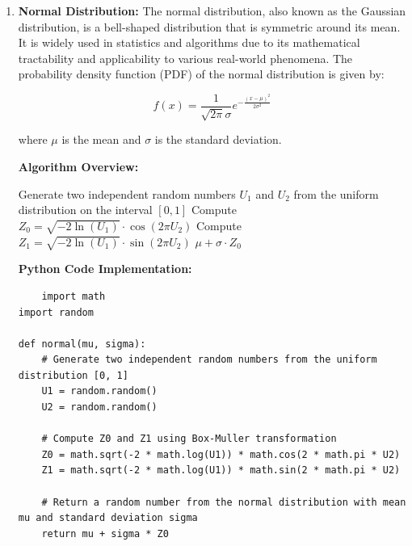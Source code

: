 \documentclass[12pt]{book} %
\begin{document}
\begin{enumerate}
\begin{lstlisting}
def binomial(n, p):
    X = 0
    for i in range(n):
        X += np.random.binomial(1, p)
    return X

# Example usage:
n = 10  # Number of trials
p = 0.5  # Probability of success
result = binomial(n, p)
print("Result:", result)
\end{lstlisting}
    
    \item \textbf{Normal Distribution:} The normal distribution, also known as the Gaussian distribution, is a bell-shaped distribution that is symmetric around its mean. It is widely used in statistics and algorithms due to its mathematical tractability and applicability to various real-world phenomena. The probability density function (PDF) of the normal distribution is given by:
    
    \[
    f(x) = \frac{1}{\sqrt{2\pi}\sigma} e^{-\frac{(x-\mu)^2}{2\sigma^2}}
    \]
    
    where \(\mu\) is the mean and \(\sigma\) is the standard deviation.

\textbf{Algorithm Overview:}
    \FloatBarrier
\begin{algorithm}
\caption{Generating Random Numbers from a Normal Distribution (Box-Muller Method)}
\begin{algorithmic}[1]
    \State Generate two independent random numbers \(U_1\) and \(U_2\) from the uniform distribution on the interval \([0, 1]\)
    \State Compute \(Z_0 = \sqrt{-2 \ln(U_1)} \cdot \cos(2\pi U_2)\)
    \State Compute \(Z_1 = \sqrt{-2 \ln(U_1)} \cdot \sin(2\pi U_2)\)
    \State \Return \(\mu + \sigma \cdot Z_0\)
\EndProcedure
\end{algorithmic}
\end{algorithm}
\FloatBarrier
\textbf{Python Code Implementation:}
\FloatBarrier
\begin{lstlisting}
    import math
import random

def normal(mu, sigma):
    # Generate two independent random numbers from the uniform distribution [0, 1]
    U1 = random.random()
    U2 = random.random()

    # Compute Z0 and Z1 using Box-Muller transformation
    Z0 = math.sqrt(-2 * math.log(U1)) * math.cos(2 * math.pi * U2)
    Z1 = math.sqrt(-2 * math.log(U1)) * math.sin(2 * math.pi * U2)

    # Return a random number from the normal distribution with mean mu and standard deviation sigma
    return mu + sigma * Z0


\end{lstlisting}
\end{enumerate}
\end{document}
